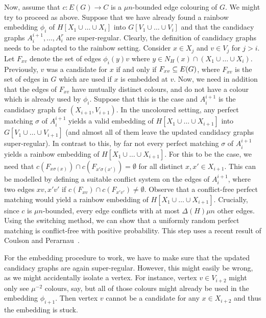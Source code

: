 \documentclass[10pt]{amsart}
\theoremstyle{definition}
\theoremstyle{claimstyle}
\theoremstyle{stepstyle}
\numberwithin{equation}{section}
\begin{document}
Now, assume that $c\colon E(G)\to C$ is a $\mu n$-bounded edge colouring of $G$. We might try to proceed as above. Suppose that we have already found a rainbow embedding $\phi_i$ of $H[X_1\cup \dots \cup X_i]$ into $G[V_1\cup \dots \cup V_i]$ and that the candidacy graphs $A_{i}^{i+1},\dots,A_i^{r}$ are super-regular. Clearly, the definition of candidacy graphs needs to be adapted to the rainbow setting.
Consider $x\in X_j$ and $v\in V_j$ for $j>i$. Let $F_{xv}$ denote the set of edges $\phi_i(y)v$ where $y\in N_H(x) \cap (X_1\cup \dots \cup X_i)$.
Previously, $v$ was a candidate for $x$ if and only if $F_{xv}\subseteq E(G)$, where $F_{xv}$ is the set of edges in $G$ which are used if $x$ is embedded at $v$. Now, we need in addition that the edges of $F_{xv}$ have mutually distinct colours, and do not have a colour which is already used by $\phi_i$.
Suppose that this is the case and $A_{i}^{i+1}$ is the candidacy graph for $(X_{i+1},V_{i+1})$.
In the uncoloured setting, any perfect matching $\sigma$ of $A_{i}^{i+1}$ yields a valid embedding of $H[X_1\cup \dots \cup X_{i+1}]$ into $G[V_1\cup \dots \cup V_{i+1}]$ (and almost all of them leave the updated candidacy graphs super-regular).
In contrast to this, by far not every perfect matching $\sigma$ of $A_{i}^{i+1}$ yields a rainbow embedding of $H[X_1\cup \dots \cup X_{i+1}]$.
For this to be the case, we need that $c(F_{x\sigma(x)})\cap c(F_{x'\sigma(x')})=\emptyset$ for all distinct $x,x'\in X_{i+1}$.
This can be modelled by defining a suitable conflict system on the edges of $A_{i}^{i+1}$, where two edges $xv,x'v'$  if $c(F_{xv})\cap c(F_{x'v'})\neq \emptyset$.
Observe that a conflict-free perfect matching would yield a rainbow embedding of $H[X_1\cup \dots \cup X_{i+1}]$.
Crucially, since $c$ is $\mu n$-bounded, every edge conflicts with at most $\Delta(H)\mu n$ other edges. Using the switching method, we can show that a uniformly random perfect matching is conflict-free with positive probability.
This step uses a recent result of Coulson and Perarnau~\cite{CP:17}.

For the embedding procedure to work, we have to make sure that the updated candidacy graphs are again super-regular. However, this might easily be wrong, as we might accidentally isolate a vertex. For instance, vertex $v\in V_{i+2}$ might only see $\mu^{-2}$ colours, say, but all of those colours might already be used in the embedding $\phi_{i+1}$. Then vertex $v$ cannot be a candidate for any $x\in X_{i+2}$ and thus the embedding is stuck.
\end{document}
